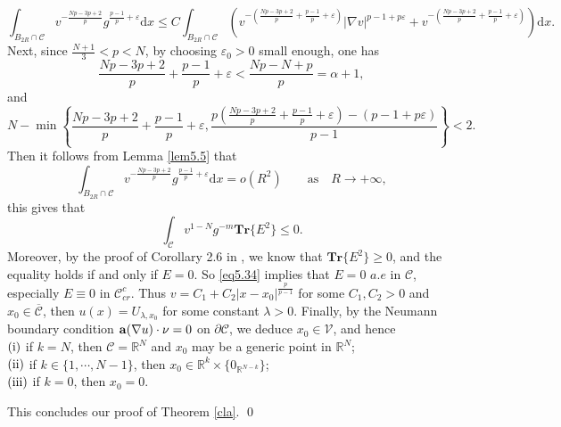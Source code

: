 \documentclass[12pt]{amsart}
\theoremstyle{definition}
\theoremstyle{remark}
\theoremstyle{conclusion}
\theoremstyle{conjecture}
\numberwithin{equation}{section}
\begin{document}
\begin{equation*}
\int_{B_{2R}\cap\mathcal{C}}  v^{-\frac{Np-3p+2}{p}}g^{\frac{p-1}{p}+\varepsilon}\mathrm{d}x\leq C\int_{B_{2R}\cap\mathcal{C}}  \left(v^{-(\frac{Np-3p+2}{p}+\frac{p-1}{p}+\varepsilon)}|\nabla v|^{p-1+p\varepsilon}+ v^{-(\frac{Np-3p+2}{p}+\frac{p-1}{p}+\varepsilon)}\right) \mathrm{d}x.
\end{equation*}
Next, since $\frac{N+1}{3}<p<N$, by choosing $\varepsilon_0>0$ small enough, one has
$$\frac{Np-3p+2}{p}+\frac{p-1}{p}+\varepsilon<\frac{Np-N+p}{p}=\alpha+1,$$
and
$$N-\min\left\{\frac{Np-3p+2}{p}+\frac{p-1}{p}+\varepsilon,\frac{p(\frac{Np-3p+2}{p}+\frac{p-1}{p}+\varepsilon)-(p-1+p\varepsilon)}{p-1}\right\} <2.$$
Then it follows from Lemma \ref{lem5.5} that
$$\int_{B_{2R}\cap\mathcal{C}}  v^{-\frac{Np-3p+2}{p}}g^{\frac{p-1}{p}+\varepsilon}\mathrm{d}x=o(R^2)\qquad\text{as}\quad R\rightarrow+\infty, $$
this gives that
\begin{equation}\label{eq5.34}
\int_{\mathcal{C}}  v^{1-N}g^{-m} \mathbf{Tr}\{E^2\}\leq 0.
\end{equation}
Moreover, by the proof of Corollary 2.6 in \cite{Ou}, we know that $\mathbf{Tr}\{E^2\}\geq 0$, and the equality holds if and only if $E=0$. So \eqref{eq5.34} implies that $E=0$ $a.e$ in $\mathcal{C}$, especially $E\equiv 0$ in $\mathcal{C}^{c}_{cr}$. Thus
$v=C_1+C_2|x-x_0|^{\frac{p}{p-1}}$
for some $C_1,C_2>0$ and $x_0\in \overline{\mathcal{C}}$, then $u(x)=U_{\lambda,x_0}$ for some constant $\lambda>0$. Finally, by the Neumann boundary condition ${\bf{a}}(\nabla u)\cdot\nu=0$ on $\partial\mathcal{C}$, we deduce $x_0\in\mathcal{V}$, and hence \\
$(\rm{i})$ if $k=N$, then $\mathcal{C}=\mathbb{R}^N$ and $x_0$ may be a generic point in $\mathbb{R}^N$;\\
  $(\rm{ii})$ if  $k\in\{1,\cdots ,N-1\}$, then $x_0\in\mathbb{R}^k\times\{0_{\mathbb{R}^{N-k}}\}$;\\
  $(\rm{iii})$ if $k=0$, then $x_0=0$.

This concludes our proof of Theorem \ref{cla}. \qed
\end{document}
